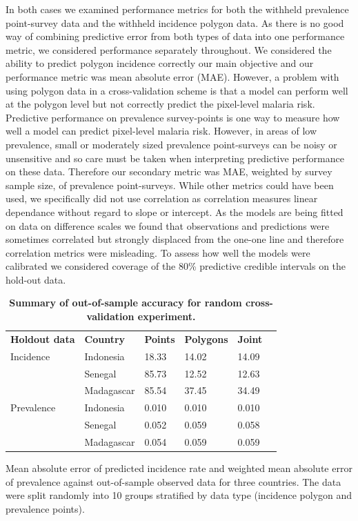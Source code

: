 \documentclass[10pt,letterpaper]{article}
\newlength\savedwidth
\newcommand\thickhline{\noalign{\global\savedwidth\arrayrulewidth\global\arrayrulewidth 2pt}%
\hline
\noalign{\global\arrayrulewidth\savedwidth}}
\begin{document}
In both cases we examined performance metrics for both the withheld prevalence point-survey data and the withheld incidence polygon data.
As there is no good way of combining predictive error from both types of data into one performance metric, we considered performance separately throughout.
We considered the ability to predict polygon incidence correctly our main objective and our performance metric was mean absolute error (MAE).
However, a problem with using polygon data in a cross-validation scheme is that a model can perform well at the polygon level but not correctly predict the pixel-level malaria risk.
Predictive performance on prevalence survey-points is one way to measure how well a model can predict pixel-level malaria risk.
However, in areas of low prevalence, small or moderately sized prevalence point-surveys can be noisy or unsensitive and so care must be taken when interpreting predictive performance on these data.
Therefore our secondary metric was MAE, weighted by survey sample size, of prevalence point-surveys.
While other metrics could have been used, we specifically did not use correlation as correlation measures linear dependance without regard to slope or intercept.
As the models are being fitted on data on difference scales we found that observations and predictions were sometimes correlated but strongly displaced from the one-one line and therefore correlation metrics were misleading.
To assess how well the models were calibrated we considered coverage of the 80\% predictive credible intervals on the hold-out data.




\begin{table}[!t]
\begin{adjustwidth}{-2.25in}{0in} %
\centering
\caption{
{\bf Summary of out-of-sample accuracy for random cross-validation experiment.}}
\begin{tabular}{llllll}
\hline
{\bf Holdout data} & {\bf Country} &  {\bf Points} & {\bf Polygons} & {\bf Joint} \\
\thickhline 
Incidence & Indonesia & 18.33 & 14.02 &  14.09\\
& Senegal & 85.73 & 12.52 &  12.63\\
& Madagascar & 85.54 & 37.45 &  34.49\vspace{3mm}\\
Prevalence & Indonesia & 0.010 & 0.010 &  0.010\\
& Senegal & 0.052 & 0.059 &  0.058\\
& Madagascar & 0.054 & 0.059 &  0.059\\
\end{tabular}
\begin{flushleft}
Mean absolute error of predicted incidence rate and weighted mean absolute error of prevalence against out-of-sample observed data for three countries.
The data were split randomly into 10 groups stratified by data type (incidence polygon and prevalence points).
\end{flushleft}
\label{table1}
\end{adjustwidth}
\end{table}
\end{document}
